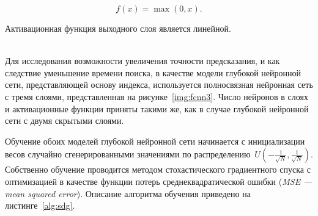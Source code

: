 
\begin{equation}\label{eq:eq01}
    f(x) = \max (0, x).
\end{equation}

Активационная функция выходного слоя является линейной.

~\\

Для исследования возможности увеличения точности предсказания, и как следствие
уменьшение времени поиска, в качестве модели глубокой нейронной сети,
представляющей основу индекса, используется полносвязная нейронная сеть с тремя
слоями, представленная на рисунке~\ref{img:fcnn3}. Число нейронов в слоях и
активационные функции приняты такими же, как в случае глубокой нейронной сети с
двумя скрытыми слоями.


Обучение обоих моделей глубокой нейронной сети начинается с инициализации весов
случайно сгенерированными значениями по распределению~$U(-\frac{1}{\sqrt{N}},
\frac{1}{\sqrt{N}})$. Собственно обучение проводится методом стохастического
градиентного спуска с оптимизацией в качестве функции потерь
среднеквадратической ошибки (\textit{MSE --- mean squared error}). Описание
алгоритма обучения приведено на листинге~\ref{alg:sdg}. 
\vspace{0.5cm}

